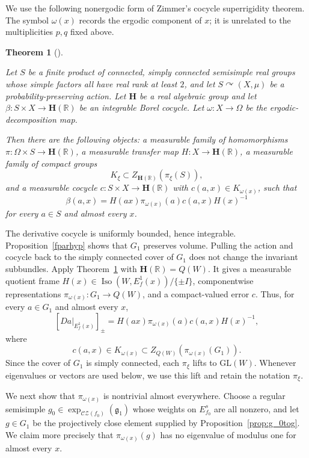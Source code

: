 \documentclass[11pt]{amsart}
\numberwithin{equation}{section}
\newcommand{\CZ}{\mathcal{CZ}}
\newcommand{\GL}{\mathrm{GL}}
\theoremstyle{plain}
\newtheorem{thm}{Theorem}[section]
\begin{document}
We use the following nonergodic form of Zimmer's cocycle superrigidity
theorem.  The symbol $\omega(x)$ records the ergodic component of $x$;
it is unrelated to the multiplicities $p,q$ fixed above.

\begin{thm}[{\cite[Theorem 4.4]{FMW}}]\label{thm:zimmer-nonerg}

Let $S$ be a finite product of connected, simply connected semisimple
real groups whose simple factors all have real rank at least $2$, and
let $S\curvearrowright(X,\mu)$ be a probability-preserving action. Let
$\mathbf H$ be a real algebraic group and let
$\beta:S\times X\to\mathbf H(\mathbb R)$ be an integrable Borel cocycle.
Let $\omega:X\to\Omega$ be the ergodic-decomposition map.

Then there are the following objects: a measurable family of homomorphisms
$\pi:\Omega\times S\to\mathbf H(\mathbb R)$, a measurable transfer
map $H:X\to\mathbf H(\mathbb R)$, a measurable family of compact
groups
\[
K_\xi\subset Z_{\mathbf H(\mathbb R)}(\pi_\xi(S)),
\]
and a measurable cocycle $c:S\times X\to\mathbf H(\mathbb R)$
with $c(a,x)\in K_{\omega(x)}$, such that
\[
\beta(a,x)=H(ax)\pi_{\omega(x)}(a)c(a,x)H(x)^{-1}
\]
for every $a\in S$ and almost every $x$.

\end{thm}


The derivative cocycle is uniformly bounded, hence
integrable.  Proposition~\ref{fparhyp} shows that $G_1$ preserves
volume.  Pulling the action and cocycle back to the simply connected
cover of $G_1$ does not change the invariant subbundles.  Apply
Theorem~\ref{thm:zimmer-nonerg} with $\mathbf H(\mathbb R)=Q(W)$.  It
gives a measurable quotient frame
$H(x)\in\operatorname{Iso}(W,E_f^1(x))/\{\pm I\}$, componentwise
representations $\pi_{\omega(x)}:G_1\to Q(W)$, and a compact-valued
error $c$.  Thus, for every $a\in G_1$ and almost every $x$,
\begin{equation}\label{eq:zimmer-decomposition}
[Da|_{E_f^1(x)}]_{\pm}
 =H(ax)\pi_{\omega(x)}(a)c(a,x)H(x)^{-1},
\end{equation}
where
\[
c(a,x)\in K_{\omega(x)}\subset
Z_{Q(W)}(\pi_{\omega(x)}(G_1)).
\]
Since the cover of $G_1$ is simply connected, each $\pi_\xi$ lifts to
$\GL(W)$.  Whenever eigenvalues or vectors are used below, we use this
lift and retain the notation $\pi_\xi$.



We next show that $\pi_{\omega(x)}$ is nontrivial almost everywhere.
Choose a regular semisimple $g_0\in\exp_{\CZ(f_0)}(\mathfrak g_1)$ whose
weights on $E_{f_0}^s$ are all nonzero, and let $g\in G_1$ be the
projectively close element supplied by
Proposition~\ref{prop:g_0tog}.  We claim more precisely that
$\pi_{\omega(x)}(g)$ has no eigenvalue of modulus one for almost every
$x$.
\end{document}
